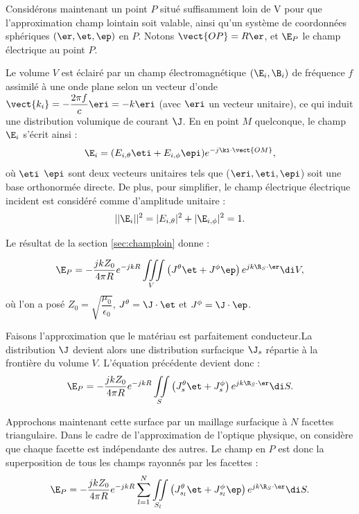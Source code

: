 Considérons maintenant un point $P$ situé suffisamment loin de V pour que l'approximation champ lointain soit valable, ainsi qu'un système de coordonnées sphériques $\left(\er,\et,\ep\right)$ en $P$. Notons $\vect{OP} = R\er$, et $\E_P$ le champ électrique au point $P$.


Le volume $V$ est éclairé par un champ électromagnétique $\left(\E_i,\B_i\right)$ de fréquence $f$ assimilé à une onde plane selon un vecteur d'onde $\vect{k_i} = -\dfrac{2\pi f}{c}\eri = -k\eri$ (avec $\eri$ un vecteur unitaire), ce qui induit une distribution volumique de courant $\J$. En en point $M$ quelconque, le champ $\E_i$ s'écrit ainsi : $$\E_i = (E_{i,\theta}\eti + E_{i,\phi}\epi)e^{-j\ki\cdot\vect{OM}},$$ où $\eti$ $\epi$ sont deux vecteurs unitaires tels que ($\eri,\eti, \epi$) soit une base orthonormée directe. De plus, pour simplifier, le champ électrique électrique incident est considéré comme d'amplitude unitaire : $$||\E_i||^2 = |E_{i,\theta}|^2 + |\E_{i,\phi}|^2 = 1.$$

Le résultat de la section \ref{sec:champloin} donne : 

\begin{equation}
	\E_P = -\frac{jkZ_0}{4\pi R}e^{-jkR}\iiint\limits_V \left(J^\theta\et + J^\phi\ep\right) e^{jk\R_S\cdot\er} \di V,
\end{equation}
%
où l'on a posé $Z_0 = \sqrt{\dfrac{\mu_0}{\epsilon_0}}$, $J^\theta = \J\cdot\et$ et $J^\phi = \J\cdot\ep$.

Faisons l'approximation que le matériau est parfaitement conducteur.La distribution $\J$ devient alors une distribution surfacique $\J_s$ répartie à la frontière du volume $V$. L'équation précédente devient donc : 
\begin{equation}
	\label{eq:surfacique}
	\E_P = -\frac{jkZ_0}{4\pi R}e^{-jkR}\iint\limits_S \left(J_s^\theta\et+J_s^\phi\right) e^{jk\R_S\cdot\er} \di S.
\end{equation}

Approchons maintenant cette surface par un maillage surfacique à $N$ facettes triangulaire. Dans le cadre de l'approximation de l'optique physique, on considère que chaque facette est indépendante des autres. Le champ en $P$ est donc la superposition de tous les champs rayonnés par les facettes :
\begin{equation}
	\label{eq:maillage}
		\E_P = -\frac{jkZ_0}{4\pi R}e^{-jkR}\sum_{l=1}^N\iint\limits_{S_l} \left(J_{s_l}^\theta\et + J_{s_l}^\phi\ep\right) e^{jk\R_S\cdot\er} \di S.
\end{equation}

